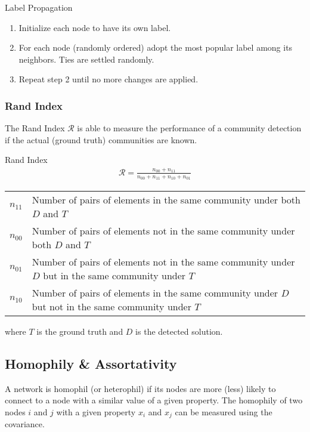 \documentclass[english]{panikzettel}
\begin{document}
\begin{algo}{Label Propagation}
\begin{enumerate}
	\item Initialize each node to have its own label.
	\item For each node (randomly ordered) adopt the most popular label among its neighbors. 
	Ties are settled randomly.
	\item Repeat step 2 until no more changes are applied.
\end{enumerate}
\end{algo}

\subsubsection{Rand Index}
The Rand Index $ \mathcal{R} $ is able to measure the performance of a community detection if the actual (ground truth) communities  are known.

\begin{defi}{Rand Index}
\begin{align*}
	\mathcal{R} = \frac{n_{00} + n_{11}}{n_{00} + n_{11} + n_{10} + n_{01}}
\end{align*}
\begin{tabular}{cp{14.5cm}}
$ n_{11} $ & Number of pairs of elements in the same community under both $ D $ and $ T $ \\
$ n_{00} $ & Number of pairs of elements not in the same community under both $ D $ and $ T $ \\
$ n_{01} $ & Number of pairs of elements not in the same community under $ D $ but in the same community under $ T $ \\
$ n_{10} $ & Number of pairs of elements in the same community under $ D $ but not in the same community under $ T $ \\
\end{tabular}

where $ T $ is the ground truth and $ D $ is the detected solution.
\end{defi}

\subsection{Homophily \& Assortativity}
A network is homophil (or heterophil) if its nodes are more (less) likely to connect to a node with a similar value of a given property.
The homophily of two nodes $ i $ and $ j $ with a given property $ x_i $ and $ x_j $ can be measured using the covariance.
\end{document}
